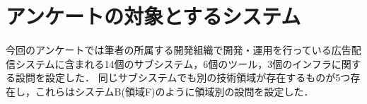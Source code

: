 \section{アンケートの対象とするシステム}
今回のアンケートでは筆者の所属する開発組織で開発・運用を行っている広告配信システムに含まれる14個のサブシステム，6個のツール，3個のインフラに関する設問を設定した．
同じサブシステムでも別の技術領域が存在するものが5つ存在し，これらはシステムB(領域F)のように領域別の設問を設定した．
